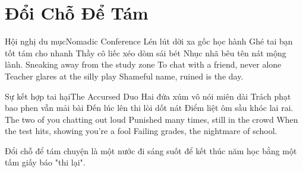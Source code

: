 \chapter{Đổi Chỗ Để Tám}

\begin{tutuyetbox}{Hội nghị du mục}{Nomadic Conference}
Lén lút dời xa gốc học hành
Ghé tai bạn tốt tám cho nhanh
Thầy cô liếc xéo dòm sái bét
Nhục nhã bêu tên nát mộng lành.
\tcblower
Sneaking away from the study zone 
To chat with a friend, never alone 
Teacher glares at the silly play 
Shameful name, ruined is the day.
\end{tutuyetbox}

\begin{tutuyetbox}{Sự kết hợp tai hại}{The Accursed Duo}
Hai đứa xúm vô nói miên dài
Trách phạt bao phen vẫn mải bài
Đến lúc lên thi lòi dốt nát
Điểm liệt ôm sầu khóc lai rai.
\tcblower
The two of you chatting out loud 
Punished many times, still in the crowd 
When the test hits, showing you're a fool 
Failing grades, the nightmare of school.
\end{tutuyetbox}

\begin{ghichu}
Đổi chỗ để tám chuyện là một nước đi sáng suốt để kết thúc năm học bằng một tấm giấy báo "thi lại".
\end{ghichu}